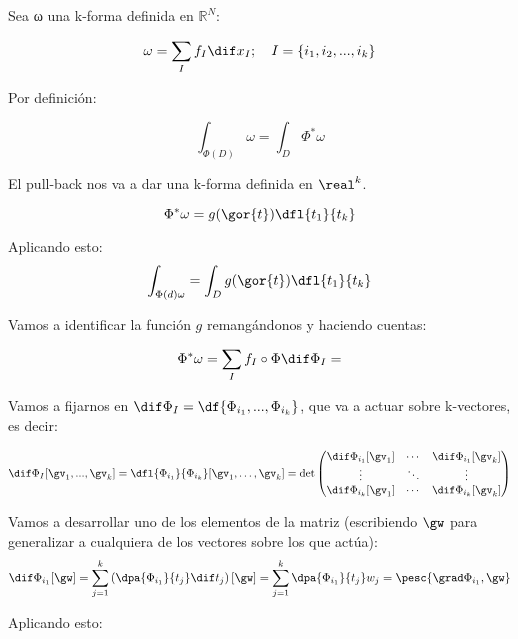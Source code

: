 Sea ω una k-forma definida en $ℝ^N$: 

\[\omega = \sum_I f_I\dif x_I; \quad I=\{i_1,i_2,...,i_k\}\]

Por definición:

\[ \int_{\Phi(D)} \omega = \int_D \Phi^{\ast}\omega \]

El pull-back nos va a dar una k-forma definida en $\real^k$.

\[
\Phi^{\ast}\omega =g(\gor{t})\dfl{t_1}{t_k}
\]

Aplicando esto:
\[
\int_{\Phi(d) \omega} = \int_D g(\gor{t})\dfl{t_1}{t_k}
\]

Vamos a identificar la función $g$ remangándonos y haciendo cuentas:

\[
\Phi^{\ast} \omega = \sum_I f_I\circ\Phi \dif \Phi_I = 
\]

Vamos a fijarnos en $\dif \Phi_I = \df{\Phi_{i_1},...,\Phi_{i_k}}$, que va a actuar sobre k-vectores, es decir:

\[
\dif \Phi_I[\gv_1,...,\gv_k] = \dfl{\Phi_{i_1}}{\Phi_{i_k}} [\gv_1,\dotsc,\gv_k] 
= \det \begin{pmatrix}
	\dif \Phi_{i_1}[\gv_1] 	& \cdots & \dif \Phi_{i_1}[\gv_k] \\
	\vdots 					& \ddots & \vdots\\
	\dif \Phi_{i_k}[\gv_1] 	& \cdots & \dif \Phi_{i_k}[\gv_k] \\
\end{pmatrix}
\]

Vamos a desarrollar uno de los elementos de la matriz (escribiendo $\gw$ para generalizar a cualquiera de los vectores sobre los que actúa):
\[
\dif \Phi_{i_1}[\gw] = \sum_{j=1}^k \left(\dpa{\Phi_{i_1}}{t_j} \dif t_j\right)[\gw] = \sum_{j=1}^k \dpa{\Phi_{i_1}}{t_j}w_j = \pesc{\grad \Phi_{i_1},\gw}
\]

Aplicando esto:

